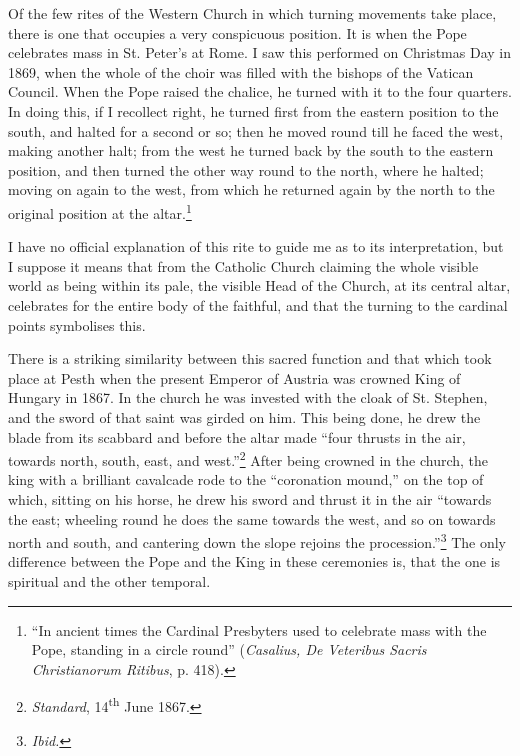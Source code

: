 \documentclass[a4paper, 11pt, oneside, polutonikogreek, english]{article}
\begin{document}
Of the few rites of the Western Church in which turning movements take place, there is one that occupies a very conspicuous position. It is when the Pope celebrates mass in St. Peter's at Rome. I saw this performed on Christmas Day in 1869, when the whole of the choir was filled with the bishops of the Vatican Council. When the Pope raised the chalice, he turned with it to the four quarters. In doing this, if I recollect right, he turned first from the eastern position to the south, and halted for a second or so; then he moved round till he faced the west, making another halt; from the west he turned back by the south to the eastern position, and then turned the other way round to the north, where he halted; moving on again to the west, from which he returned again by the north to the original position at the altar.\footnote{``In ancient times the Cardinal Presbyters used to celebrate mass with the Pope, standing in a circle round'' (\emph{Casalius, De Veteribus Sacris Christianorum Ritibus}, p. 418).}

I have no official explanation of this rite to guide me as to its interpretation, but I suppose it means that from the Catholic Church claiming the whole visible world as being within its pale, the visible Head of the Church, at its central altar, celebrates for the entire body of the faithful, and that the turning to the cardinal points symbolises this.

There is a striking similarity between this sacred function and that which took place at Pesth when the present Emperor of Austria was crowned King of Hungary in 1867. In the church he was invested with the cloak of St. Stephen, and the sword of that saint was girded on him. This being done, he drew the blade from its scabbard and before the altar made ``four thrusts in the air, towards north, south, east, and west.''\footnote{\emph{Standard}, 14\textsuperscript{th} June 1867.} After being crowned in the church, the king with a brilliant cavalcade rode to the ``coronation mound,'' on the top of which, sitting on his horse, he drew his sword and thrust it in the air ``towards the east; wheeling round he does the same towards the west, and so on towards north and south, and cantering down the slope rejoins the procession.''\footnote{\emph{Ibid.}} The only difference between the Pope and the King in these ceremonies is, that the one is spiritual and the other temporal.
\end{document}

